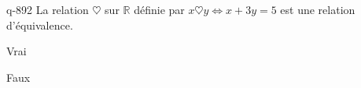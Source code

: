 \begin{truefalse}{q-892}
La relation $\heartsuit$ sur $\mathbb R$ définie par $x\heartsuit y \iff x+3y=5$ est une relation d'équivalence.
\item Vrai
\item* Faux
\end{truefalse}

